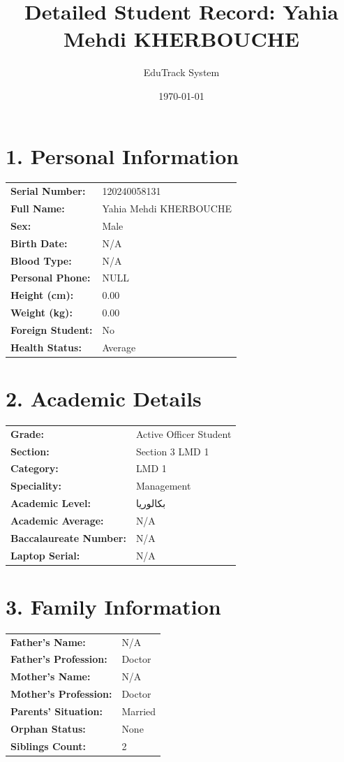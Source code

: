 \documentclass[a4paper,12pt]{article}
\title{Detailed Student Record: Yahia Mehdi KHERBOUCHE}
\author{EduTrack System}
\date{\today}
\begin{document}
\maketitle

\section*{1. Personal Information}
\begin{tabular}{lp{10cm}}
\textbf{Serial Number:} & 120240058131 \\
\textbf{Full Name:} & Yahia Mehdi KHERBOUCHE \\
\textbf{Sex:} & Male \\
\textbf{Birth Date:} & N/A \\
\textbf{Blood Type:} & N/A \\
\textbf{Personal Phone:} & NULL \\
\textbf{Height (cm):} & 0.00 \\
\textbf{Weight (kg):} & 0.00 \\
\textbf{Foreign Student:} & No \\
\textbf{Health Status:} & Average \\
\end{tabular}

\section*{2. Academic Details}
\begin{tabular}{lp{10cm}}
\textbf{Grade:} & Active Officer Student \\
\textbf{Section:} & Section 3 LMD 1 \\
\textbf{Category:} & LMD 1 \\
\textbf{Speciality:} & Management \\
\textbf{Academic Level:} & بكالوريا \\
\textbf{Academic Average:} & N/A \\
\textbf{Baccalaureate Number:} & N/A \\
\textbf{Laptop Serial:} & N/A \\
\end{tabular}

\section*{3. Family Information}
\begin{tabular}{lp{10cm}}
\textbf{Father's Name:} & N/A \\
\textbf{Father's Profession:} & Doctor \\
\textbf{Mother's Name:} & N/A \\
\textbf{Mother's Profession:} & Doctor \\
\textbf{Parents' Situation:} & Married \\
\textbf{Orphan Status:} & None \\
\textbf{Siblings Count:} & 2 \\
\end{tabular}
\end{document}
